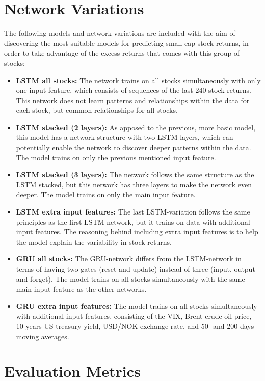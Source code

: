 \section{Network Variations}
The following models and network-variations are included with the aim of discovering the most suitable models for predicting small cap stock returns, in order to take advantage of the excess returns that comes with this group of stocks:

\indent \newline
\begin{itemize}
\item {\textbf{LSTM all stocks:} The network trains on all stocks simultaneously with only one input feature, which consists of sequences of the last 240 stock returns. This network does not learn patterns and relationships within the data for each stock, but common relationships for all stocks.} 
\item {\textbf{LSTM stacked (2 layers):} As apposed to the previous, more basic model, this model has a network structure with two LSTM layers, which can potentially enable the network to discover deeper patterns within the data. The model trains on only the previous mentioned input feature.}
\item {\textbf{LSTM stacked (3 layers):} The network follows the same structure as the LSTM stacked, but this network has three layers to make the network even deeper. The model trains on only the main input feature.}
\item {\textbf{LSTM extra input features:} The last LSTM-variation follows the same principles as the first LSTM-network, but it trains on data with additional input features. The reasoning behind including extra input features is to help the model explain the variability in stock returns.}
\item {\textbf{GRU all stocks:} The GRU-network differs from the LSTM-network in terms of having two gates (reset and update) instead of three (input, output and forget). The model trains on all stocks simultaneously with the same main input feature as the other networks.}
\item {\textbf{GRU extra input features:} The model trains on all stocks simultaneously with additional input features, consisting of the VIX, Brent-crude oil price, 10-years US treasury yield, USD/NOK exchange rate, and 50- and 200-days moving averages.}
\end{itemize}

\section{Evaluation Metrics}
